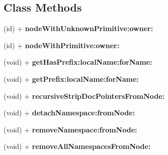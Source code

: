 \subsection*{Class Methods}
\begin{DoxyCompactItemize}
\item 
\hypertarget{category_d_d_x_m_l_node_07_private_a_p_i_08_a3639155d9e97f9da7cbaa9bd34e800f1}{}(id) + {\bfseries node\+With\+Unknown\+Primitive\+:owner\+:}\label{category_d_d_x_m_l_node_07_private_a_p_i_08_a3639155d9e97f9da7cbaa9bd34e800f1}

\item 
\hypertarget{category_d_d_x_m_l_node_07_private_a_p_i_08_a93016651076edfa8b720ac9574d9b6c9}{}(id) + {\bfseries node\+With\+Primitive\+:owner\+:}\label{category_d_d_x_m_l_node_07_private_a_p_i_08_a93016651076edfa8b720ac9574d9b6c9}

\item 
\hypertarget{category_d_d_x_m_l_node_07_private_a_p_i_08_ab23e004d1e18c9d65b9e11db73da3448}{}(void) + {\bfseries get\+Has\+Prefix\+:local\+Name\+:for\+Name\+:}\label{category_d_d_x_m_l_node_07_private_a_p_i_08_ab23e004d1e18c9d65b9e11db73da3448}

\item 
\hypertarget{category_d_d_x_m_l_node_07_private_a_p_i_08_adb4e63166c6d3003c48047bcfb63d252}{}(void) + {\bfseries get\+Prefix\+:local\+Name\+:for\+Name\+:}\label{category_d_d_x_m_l_node_07_private_a_p_i_08_adb4e63166c6d3003c48047bcfb63d252}

\item 
\hypertarget{category_d_d_x_m_l_node_07_private_a_p_i_08_a956c1a20cfd53803bb29bbc5bbb38eba}{}(void) + {\bfseries recursive\+Strip\+Doc\+Pointers\+From\+Node\+:}\label{category_d_d_x_m_l_node_07_private_a_p_i_08_a956c1a20cfd53803bb29bbc5bbb38eba}

\item 
\hypertarget{category_d_d_x_m_l_node_07_private_a_p_i_08_aab8ec1dee2f69113731f8881129ddbaf}{}(void) + {\bfseries detach\+Namespace\+:from\+Node\+:}\label{category_d_d_x_m_l_node_07_private_a_p_i_08_aab8ec1dee2f69113731f8881129ddbaf}

\item 
\hypertarget{category_d_d_x_m_l_node_07_private_a_p_i_08_a521f0b324b89565ffe71088a14772cc7}{}(void) + {\bfseries remove\+Namespace\+:from\+Node\+:}\label{category_d_d_x_m_l_node_07_private_a_p_i_08_a521f0b324b89565ffe71088a14772cc7}

\item 
\hypertarget{category_d_d_x_m_l_node_07_private_a_p_i_08_a136283ff908d3d059b4a2fb0bf95b061}{}(void) + {\bfseries remove\+All\+Namespaces\+From\+Node\+:}\label{category_d_d_x_m_l_node_07_private_a_p_i_08_a136283ff908d3d059b4a2fb0bf95b061}


\end{DoxyCompactItemize}

